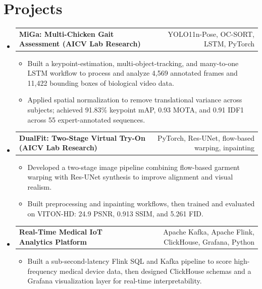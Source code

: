 \documentclass[letterpaper,10pt]{article}
\makeatletter
\newcommand{\resumeSingleHeading}[2]{\vspace{1pt}\item\begin{tabular*}{0.985\textwidth}{l@{\extracolsep{\fill}}r}\textbf{#1} & \small#2 \\ \end{tabular*}\vspace{2pt}}
\newcommand{\resumeItem}[1]{\item\small{#1}}
\newcommand{\resumeSubHeadingListStart}{\begin{itemize}[leftmargin=0.0in,label={}]}
\newcommand{\resumeSubHeadingListEnd}{\end{itemize}\vspace{-2pt}}
\newcommand{\resumeItemListStart}{\begin{itemize}[leftmargin=0.17in]}
\newcommand{\resumeItemListEnd}{\end{itemize}\vspace{2pt}}
\makeatother
\begin{document}
\section{Projects}
\resumeSubHeadingListStart
  \resumeSingleHeading{MiGa: Multi-Chicken Gait Assessment (AICV Lab Research)}{YOLO11n-Pose, OC-SORT, LSTM, PyTorch}
  \resumeItemListStart
    \resumeItem{Built a keypoint-estimation, multi-object-tracking, and many-to-one LSTM workflow to process and analyze 4,569 annotated frames and 11,422 bounding boxes of biological video data.}
    \resumeItem{Applied spatial normalization to remove translational variance across subjects; achieved 91.83\% keypoint mAP, 0.93 MOTA, and 0.91 IDF1 across 55 expert-annotated sequences.}
  \resumeItemListEnd
  \resumeSingleHeading{DualFit: Two-Stage Virtual Try-On (AICV Lab Research)}{PyTorch, Res-UNet, flow-based warping, inpainting}
  \resumeItemListStart
    \resumeItem{Developed a two-stage image pipeline combining flow-based garment warping with Res-UNet synthesis to improve alignment and visual realism.}
    \resumeItem{Built preprocessing and inpainting workflows, then trained and evaluated on VITON-HD: 24.9 PSNR, 0.913 SSIM, and 5.261 FID.}
  \resumeItemListEnd
  \resumeSingleHeading{Real-Time Medical IoT Analytics Platform}{Apache Kafka, Apache Flink, ClickHouse, Grafana, Python}
  \resumeItemListStart
    \resumeItem{Built a sub-second-latency Flink SQL and Kafka pipeline to score high-frequency medical device data, then designed ClickHouse schemas and a Grafana visualization layer for real-time interpretability.}
  \resumeItemListEnd
\resumeSubHeadingListEnd
\end{document}
